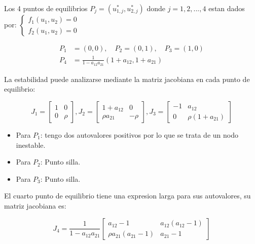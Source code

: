 \documentclass[twocolumn,aps,prl]{revtex4-1}
\begin{document}

Los 4 puntos de equilibrios $P_j = (u^*_{1,j},u^*_{2,j})$ donde $j= 1, 2, ..., 4$ estan dados por: $\left\lbrace
\begin{aligned}
    f_1(u_1, u_2) = 0\\ 
    f_2(u_1, u_2) = 0
\end{aligned} \right.
$

$$
\begin{aligned}
    P_1 &= (0, 0), \quad P_2 = (0, 1), \quad P_3 = (1, 0) \\ 
    P_4 &= \frac{1}{1-a_{12} a_{21}}(1+a_{12}, 1+a_{21})
\end{aligned}
$$

La estabilidad puede analizarse mediante la matriz jacobiana en cada punto de equilibrio:

$$
J_1 = \begin{bmatrix}
    1 & 0 \\
    0 & \rho 
\end{bmatrix}
,
J_2 = \begin{bmatrix}
    1 + a_{12} & 0 \\
     \rho a_{21} & - \rho 
\end{bmatrix}
,
J_3 = \begin{bmatrix}
    -1 & a_{12} \\
    0      & \rho \left( 1 + a_{21} \right)
\end{bmatrix}
$$

\begin{itemize}
    \item Para $P_1$: tengo dos autovalores positivos por lo que se trata de un nodo inestable.
    \item Para $P_2$: Punto silla.
    \item Para $P_3$: Punto silla.
\end{itemize}

El cuarto punto de equilibrio tiene una expresion larga para sus autovalores, su matriz jacobiana es:

$$
J_4 = 
\frac{1}{1-a_{12} a_{21}}
\begin{bmatrix}
    a_{12} - 1 & a_{12} (a_{12} - 1) \\
    \rho a_{21} (a_{21} - 1) & a_{21} - 1
\end{bmatrix}
$$
\end{document}
